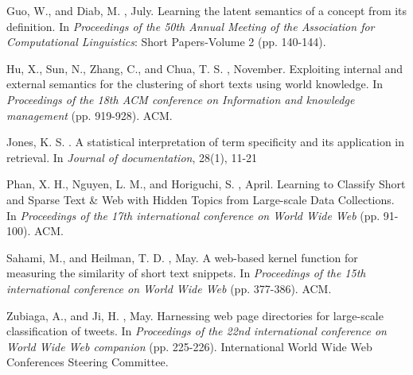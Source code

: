 \documentclass[11pt]{article}
\begin{document}
\begin{thebibliography}{}
Guo, W., and Diab, M.
, July.
\newblock Learning the latent semantics of a concept from its definition.
\newblock In {\em Proceedings of the 50th Annual Meeting of the Association for Computational Linguistics}: Short Papers-Volume 2 (pp. 140-144).

Hu, X., Sun, N., Zhang, C., and Chua, T. S.
, November.
\newblock Exploiting internal and external semantics for the clustering of short texts using world knowledge.
\newblock In {\em Proceedings of the 18th ACM conference on Information and knowledge management} (pp. 919-928). ACM.

Jones, K. S.
.
\newblock A statistical interpretation of term specificity and its application in retrieval.
\newblock In {\em Journal of documentation}, 28(1), 11-21

Phan, X. H., Nguyen, L. M., and Horiguchi, S.
, April.
\newblock Learning to Classify Short and Sparse Text \& Web with Hidden Topics from Large-scale Data Collections.
\newblock In {\em Proceedings of the 17th international conference on World Wide Web} (pp. 91-100). ACM.

Sahami, M., and Heilman, T. D.
, May.
\newblock A web-based kernel function for measuring the similarity of short text snippets.
\newblock In {\em Proceedings of the 15th international conference on World Wide Web} (pp. 377-386). ACM.

Zubiaga, A., and Ji, H.
, May.
\newblock Harnessing web page directories for large-scale classification of tweets.
\newblock In {\em Proceedings of the 22nd international conference on World Wide Web companion} (pp. 225-226). International World Wide Web Conferences Steering Committee.

\end{thebibliography}
\end{document}
